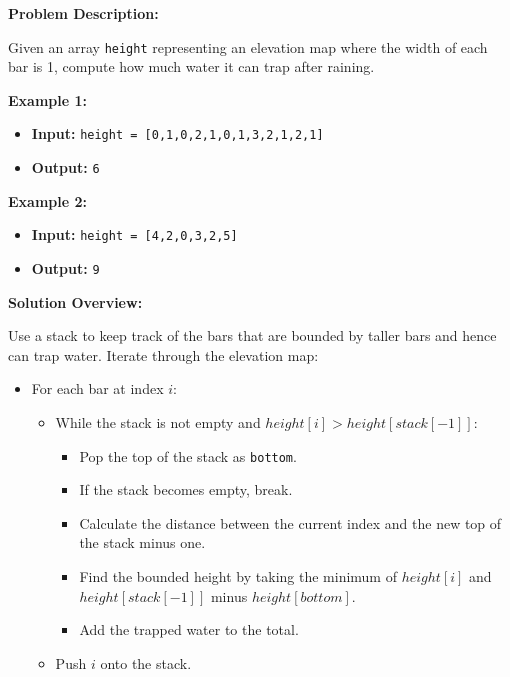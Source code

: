 

\textbf{Problem Description:}

Given an array \texttt{height} representing an elevation map where the width of each bar is 1, compute how much water it can trap after raining.

\textbf{Example 1:}

\begin{itemize}
    \item \textbf{Input:} \texttt{height = [0,1,0,2,1,0,1,3,2,1,2,1]}
    \item \textbf{Output:} \texttt{6}
\end{itemize}

\textbf{Example 2:}

\begin{itemize}
    \item \textbf{Input:} \texttt{height = [4,2,0,3,2,5]}
    \item \textbf{Output:} \texttt{9}
\end{itemize}

\textbf{Solution Overview:}

Use a stack to keep track of the bars that are bounded by taller bars and hence can trap water. Iterate through the elevation map:

\begin{itemize}
    \item For each bar at index \( i \):
        \begin{itemize}
            \item While the stack is not empty and \( height[i] > height[stack[-1]] \):
                \begin{itemize}
                    \item Pop the top of the stack as \texttt{bottom}.
                    \item If the stack becomes empty, break.
                    \item Calculate the distance between the current index and the new top of the stack minus one.
                    \item Find the bounded height by taking the minimum of \( height[i] \) and \( height[stack[-1]] \) minus \( height[bottom] \).
                    \item Add the trapped water to the total.
                \end{itemize}
            \item Push \( i \) onto the stack.
        \end{itemize}
\end{itemize}

